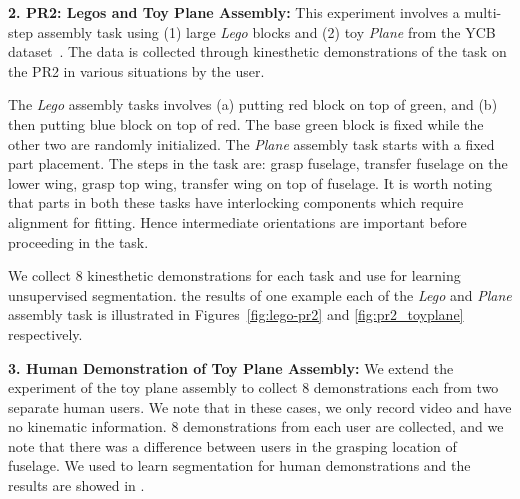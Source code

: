 
\vspace{5pt}
\noindent \textbf{2. PR2: Legos and Toy Plane Assembly: }
This experiment involves a multi-step assembly task using (1) large \textit{Lego} blocks and (2) toy \textit{Plane} from the YCB dataset~\cite{calli2015corr}. The data is collected through kinesthetic demonstrations of the task on the PR2 in various situations by the user. 

The \textit{Lego} assembly tasks involves (a) putting red block on top of green, and (b) then putting blue block on top of red. The base green block is fixed while the other two are randomly initialized. The \textit{Plane} assembly task starts with a fixed part placement. The steps in the task are: grasp fuselage, transfer fuselage on the lower wing, grasp top wing, transfer wing on top of fuselage. It is worth noting that parts in both these tasks have interlocking components which require alignment for fitting. Hence intermediate orientations are important before proceeding in the task. 

We collect 8 kinesthetic demonstrations for each task and use \TSC for learning unsupervised segmentation. the results of one example each of the \textit{Lego} and \textit{Plane} assembly task is illustrated in Figures~\ref{fig:lego-pr2} and \ref{fig:pr2_toyplane} respectively.

\vspace{5pt}
\noindent \textbf{3. Human Demonstration of Toy Plane Assembly: }
We extend the experiment of the toy plane assembly to collect 8 demonstrations each from two separate human users. We note that in these cases, we only record video and have no kinematic information. 8 demonstrations from each user are collected, and we note that there was a difference between users in the grasping location of fuselage. We used \TSC to learn segmentation for human demonstrations and the results are showed in .

